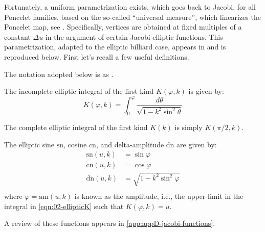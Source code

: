 Fortunately, a uniform parametrization exists, which goes back to Jacobi, for all Poncelet families, based on the so-called ``universal measure'', which linearizes the Poncelet map, see \cite{koiller2021-spatial}. Specifically, vertices are obtained at fixed multiples of a constant $\Delta{u}$ in the argument of certain Jacobi elliptic functions. This parametrization, adapted to the elliptic billiard case, appears in \cite{stachel2021-billiards,stachel2021-billiards-param} and is reproduced below. First let's recall a few useful definitions. 

The  notation adopted below is as \cite{armitage-2006}. 

\begin{definition}
The incomplete elliptic integral of the first kind $K(\varphi,k)$ is given by:
\begin{equation}
K(\varphi,k)=\int_0^{\varphi}\frac{d\theta}{\sqrt{1-k^2 \sin^2\theta}}
\label{eqn:02-ellipticK}
\end{equation}

The complete elliptic integral of the first kind $K(k)$ is simply $K(\pi/2,k)$.
\end{definition}

\begin{definition}
The elliptic sine $\text{sn}$, cosine $\text{cn}$, and delta-amplitude $\text{dn}$ are given by:
\begin{align*}
\text{sn}(u,k)&=\sin\varphi\\
\text{cn}(u,k)&=\cos\varphi\\
\text{dn}(u,k)&=\sqrt{1- k^2\sin^2\varphi}\\
\end{align*}
where $\varphi=\text{am}(u,k)$ is known as the amplitude, i.e., the upper-limit in the integral in \cref{eqn:02-ellipticK} such that $K(\varphi,k)=u$.
\end{definition}
A review of these functions appears in \cref{app:appD-jacobi-functions}.

